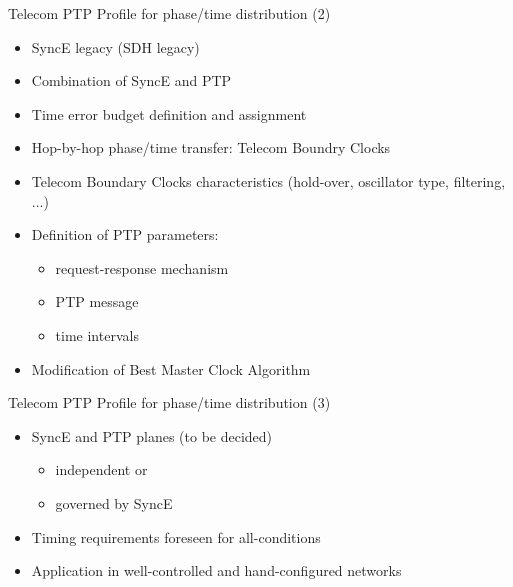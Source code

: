 \documentclass[compress,red]{beamer}
\begin{document}
\begin{frame}{Telecom PTP Profile for phase/time distribution (2)}

  \begin{itemize}
    \item SyncE legacy (SDH legacy)

    \item Combination of SyncE and PTP
    \item Time error budget definition and assignment
    \item Hop-by-hop phase/time transfer: Telecom Boundry Clocks
    \item Telecom Boundary Clocks characteristics (hold-over, oscillator type, filtering, ...)
    \item Definition of PTP parameters:
	\begin{itemize}
	  \item request-response mechanism
	  \item PTP message 
	  \item time intervals
	\end{itemize}
    \item Modification of Best Master Clock Algorithm
  \end{itemize}


\end{frame}
\begin{frame}{Telecom PTP Profile for phase/time distribution (3)}

  \begin{itemize}
   \item SyncE and PTP planes (to be decided)
	\begin{itemize}
	  \item independent or
	  \item governed by SyncE
	\end{itemize}
    \item Timing requirements foreseen for all-conditions
    \item Application in well-controlled and hand-configured networks
  \end{itemize}


\end{frame}
\end{document}
